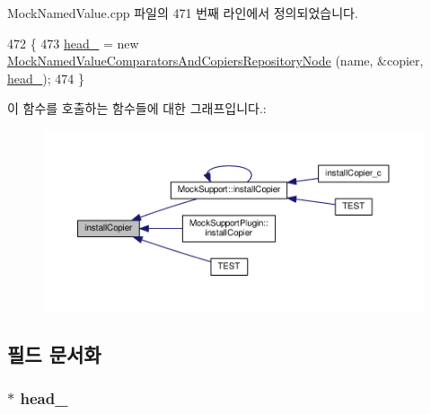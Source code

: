 Mock\+Named\+Value.\+cpp 파일의 471 번째 라인에서 정의되었습니다.


\begin{DoxyCode}
472 \{
473     \hyperlink{class_mock_named_value_comparators_and_copiers_repository_a9b7330472fa269c68e74f4f37384fcf3}{head\_} = \textcolor{keyword}{new} \hyperlink{struct_mock_named_value_comparators_and_copiers_repository_node}{MockNamedValueComparatorsAndCopiersRepositoryNode}
      (name, &copier, \hyperlink{class_mock_named_value_comparators_and_copiers_repository_a9b7330472fa269c68e74f4f37384fcf3}{head\_});
474 \}
\end{DoxyCode}


이 함수를 호출하는 함수들에 대한 그래프입니다.\+:
\nopagebreak
\begin{figure}[H]
\begin{center}
\leavevmode
\includegraphics[width=350pt]{class_mock_named_value_comparators_and_copiers_repository_a558aef2ec4dc86ff685a8e3cf9e86441_icgraph}
\end{center}
\end{figure}




\subsection{필드 문서화}
\subsubsection[{\texorpdfstring{head\+\_\+}{head_}}]{$\ast$ head\+\_\+\hspace{0.3cm}{\ttfamily [private]}}\hypertarget{class_mock_named_value_comparators_and_copiers_repository_a9b7330472fa269c68e74f4f37384fcf3}{}\label{class_mock_named_value_comparators_and_copiers_repository_a9b7330472fa269c68e74f4f37384fcf3}


